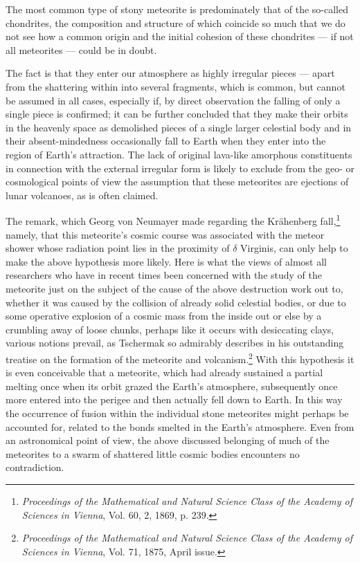 \documentclass[a4paper, 12pt, oneside]{article}
\begin{document}
The most common type of stony meteorite is predominately that of the so-called chondrites, the composition and structure of which coincide so much that we do not see how a common origin and the initial cohesion of these chondrites --- if not all meteorites --- could be in doubt.

The fact is that they enter our atmosphere as highly irregular pieces --- apart from the shattering within into several fragments, which is common, but cannot be assumed in all cases, especially if, by direct observation the falling of only a single piece is confirmed; it can be further concluded that they make their orbits in the heavenly space as demolished pieces of a single larger celestial body and in their absent-mindedness occasionally fall to Earth when they enter into the region of Earth's attraction. The lack of original lava-like amorphous constituents in connection with the external irregular form is likely to exclude from the geo- or cosmological points of view the assumption that these meteorites are ejections of lunar volcanoes, as is often claimed.

The remark, which Georg von Neumayer made regarding the Krähenberg fall,\footnote{\emph{Proceedings of the Mathematical and Natural Science Class of the Academy of Sciences in Vienna}, Vol. 60, 2, 1869, p. 239.} namely, that this meteorite's cosmic course was associated with the meteor shower whose radiation point lies in the proximity of $\delta$ Virginis, can only help to make the above hypothesis more likely. Here is what the views of almost all researchers who have in recent times been concerned with the study of the meteorite just on the subject of the cause of the above destruction work out to, whether it was caused by the collision of already solid celestial bodies, or due to some operative explosion of a cosmic mass from the inside out or else by a crumbling away of loose chunks, perhaps like it occurs with desiccating clays, various notions prevail, as Tschermak so admirably describes in his outstanding treatise on the formation of the meteorite and volcanism.\footnote{\emph{Proceedings of the Mathematical and Natural Science Class of the Academy of Sciences in Vienna}, Vol. 71, 1875, April issue.} With this hypothesis it is even conceivable that a meteorite, which had already sustained a partial melting once when its orbit grazed the Earth's atmosphere, subsequently once more entered into the perigee and then actually fell down to Earth. In this way the occurrence of fusion within the individual stone meteorites might perhaps be accounted for, related to the bonds smelted in the Earth's atmosphere. Even from an astronomical point of view, the above discussed belonging of much of the meteorites to a swarm of shattered little cosmic bodies encounters no contradiction.
\end{document}

